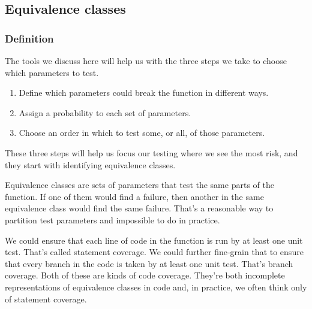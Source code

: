 \documentclass[fleqn,10pt]{olplainarticle}
\begin{document}
\subsection{Equivalence classes}\label{sec:limits}

\subsubsection{Definition}
%
% 

The tools we discuss here will help us with the three steps
we take to choose which parameters to test.

\begin{enumerate}
  \item Define which parameters could break the function in different ways.

  \item Assign a probability to each set of parameters.

  \item Choose an order in which to test some, or all, of those
   parameters.
\end{enumerate}

\noindent{}These three steps will help us focus our testing
where we see the most risk, and they start with identifying
equivalence classes.

Equivalence classes are sets of parameters that test the same
parts of the function. If one of them would find a failure,
then another in the same equivalence class would find the same
failure. That's a reasonable way to partition test parameters
and impossible to do in practice.

We could ensure that each line of code in the function is
run by at least one unit test. That's called statement coverage.
We could further fine-grain that to ensure that every branch
in the code is taken by at least one unit test. That's
branch coverage. Both of these are kinds of code coverage.
They're both incomplete representations of equivalence classes
in code and, in practice, we often think only of statement
coverage.
\end{document}
